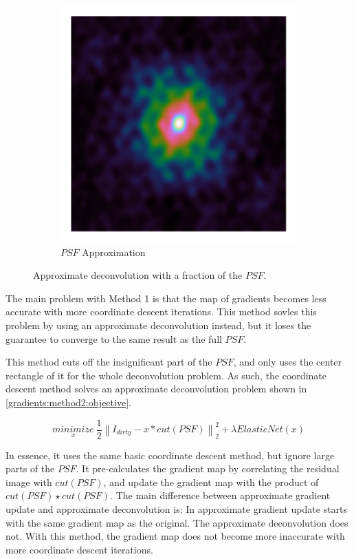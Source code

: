 \begin{figure}[h]
\begin{subfigure}[b]{0.3\linewidth}
		\includegraphics[width=\linewidth, trim= 0.25in 0.25in 0.25in 0.25in]{./chapters/03.cd/simulated/psf.png}
		\caption{$PSF$ Approximation}
	\end{subfigure}
	
	\caption{Approximate deconvolution with a fraction of the $PSF$.}
\end{figure} 
The main problem with Method 1 is that the map of gradients becomes less accurate with more coordinate descent iterations. This method sovles this problem by using an approximate deconvolution instead, but it loses the guarantee to converge to the same result as the full $PSF$.

This method cuts off the insignificant part of the $PSF$, and only uses the center rectangle of it for the whole deconvolution problem. As such, the coordinate descent method solves an approximate deconvolution problem shown in \eqref{gradients:method2:objective}.

\begin{equation}\label{gradients:method2:objective}
\underset{x}{minimize} \: \frac{1}{2} \left \| I_{dirty} - x * cut(PSF) \right \|_2^2 + \lambda ElasticNet(x)
\end{equation}

In essence, it uses the same basic coordinate descent method, but ignore large parts of the $PSF$. It pre-calculates the gradient map by correlating the residual image with $cut(PSF)$, and update the gradient map with the product of $cut(PSF) \star cut(PSF)$. The main difference between approximate gradient update and approximate deconvolution is: In approximate gradient update starts with the same gradient map as the original. The approximate deconvolution does not. With this method, the gradient map does not become more inaccurate with more coordinate descent iterations.

